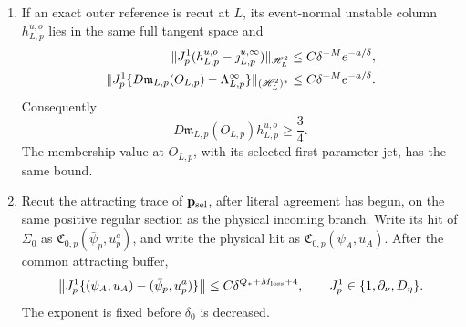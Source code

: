 \begin{lemma}
\begin{enumerate}[label=\textup{(\roman*)}]
\item If an exact outer reference is recut at \(L\), its event-normal
unstable column \(h_{L,p}^{u,o}\) lies in the same full tangent space and
\begin{align}
 \|J_p^1(h_{L,p}^{u,o}-\jmath_{L,p}^{u,\infty})\|_{\mathscr H_L^2}
 &\le C\delta^{-M}e^{-a/\delta},\notag\\
 \|J_p^1\{D\mathfrak m_{L,p}(O_{L,p})
              -\Lambda_{L,p}^{\infty}\}\|_{(\mathscr H_L^2)^*}
 &\le C\delta^{-M}e^{-a/\delta}.
 \label{eq:lean-anchor-terminal-history-comparison}
\end{align}
Consequently
\begin{equation}
 D\mathfrak m_{L,p}(O_{L,p})h_{L,p}^{u,o}\ge\frac34 .
 \label{eq:lean-anchor-terminal-crossing}
\end{equation}
The membership value at \(O_{L,p}\), with its selected first parameter
jet, has the same bound.

\item Recut the attracting trace of \(\mathbf p_{\rm sel}\), after
literal agreement has begun, on the same positive regular section as the
physical incoming branch.  Write its hit of \(\Sigma_0\) as
\(\mathfrak C_{0,p}(\bar\psi_p,u_p^a)\), and write the physical hit as
\(\mathfrak C_{0,p}(\psi_A,u_A)\).  After the common attracting buffer,
\begin{equation}
 \bigl\|J_p^1\{(\psi_A,u_A)
       -(\bar\psi_p,u_p^a)\}\bigr\|
 \le C\delta^{Q_*+M_{\rm loss}+4},
 \qquad J_p^1\in\{1,\partial_\nu,D_\eta\}.
 \label{eq:lean-anchor-positive-selected-flatness}
\end{equation}
The exponent is fixed before \(\delta_0\) is decreased.
\end{enumerate}
\end{lemma}

